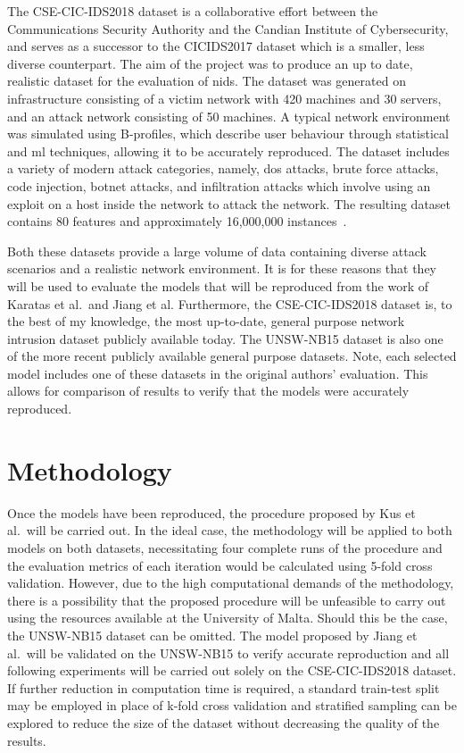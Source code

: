 The CSE-CIC-IDS2018 dataset is a collaborative effort between the
Communications Security Authority and the Candian Institute of Cybersecurity,
and serves as a successor to the CICIDS2017 dataset which is a smaller, less
diverse counterpart. The aim of the project was to produce an up to date,
realistic dataset for the evaluation of \gls{nids}. The dataset was generated
on infrastructure consisting of a victim network with 420 machines and 30
servers, and an attack network consisting of 50 machines. A typical network
environment was simulated using B-profiles, which describe user behaviour
through statistical and \gls{ml} techniques, allowing it to be accurately
reproduced. The dataset includes a variety of modern attack categories, namely,
\gls{dos} attacks, brute force attacks, code injection, botnet attacks, and
infiltration attacks which involve using an exploit on a host inside the
network to attack the network. The resulting dataset contains 80 features and
approximately 16,000,000 instances~\cite{cic2018, cic2018data}.

Both these datasets provide a large volume of data containing diverse attack
scenarios and a realistic network environment. It is for these reasons that
they will be used to evaluate the models that will be reproduced from the work
of Karatas et al.\ and Jiang et al. Furthermore, the CSE-CIC-IDS2018 dataset
is, to the best of my knowledge, the most up-to-date, general purpose network
intrusion dataset publicly available today. The UNSW-NB15 dataset is also one
of the more recent publicly available general purpose datasets. Note, each
selected model includes one of these datasets in the original authors'
evaluation. This allows for comparison of results to verify that the models
were accurately reproduced.

\section{Methodology}%
\label{sec:methodology}

Once the models have been reproduced, the procedure proposed by Kus et al.\
will be carried out. In the ideal case, the methodology will be applied to both
models on both datasets, necessitating four complete runs of the procedure and
the evaluation metrics of each iteration would be calculated using 5-fold cross
validation. However, due to the high computational demands of the methodology,
there is a possibility that the proposed procedure will be unfeasible to carry
out using the resources available at the University of Malta. Should this be
the case, the UNSW-NB15 dataset can be omitted. The model proposed by Jiang et
al.\ will be validated on the UNSW-NB15 to verify accurate reproduction and all
following experiments will be carried out solely on the CSE-CIC-IDS2018
dataset. If further reduction in computation time is required, a standard
train-test split may be employed in place of k-fold cross validation and
stratified sampling can be explored to reduce the size of the dataset without
decreasing the quality of the results.

